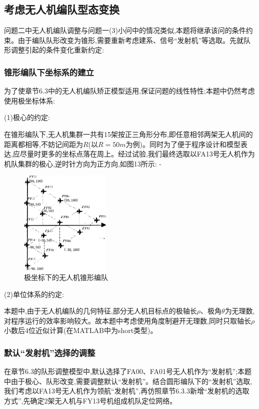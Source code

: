 \documentclass[withoutpreface,bwprint]{cumcmthesis}
\begin{document}
	\subsection{考虑无人机编队型态变换}
	
	问题二中无人机编队调整与问题一(3)小问中的情况类似,本题将继承该问的条件约束。由于编队队形改变为锥形,需要重新考虑建系、信号“发射机”等选取。先就队形调整引起的条件变化重新约定:
	
	\subsubsection{锥形编队下坐标系的建立}
	
	为了使章节6.3中的无人机编队矫正模型适用,保证问题的线性特性;本题中仍然考虑使用极坐标体系:
	
	(1)极心的约定:
	
	在锥形编队下,无人机集群一共有15架按正三角形分布,即任意相邻两架无人机间的距离都相等,不妨记间距为$R$(以$R=50m$为例)。同时为了便于程序设计和模型表达,应尽量时更多的坐标点落在周上。经过试验,我们最终选取以FA13号无人机作为机队集群的极心,逆时针方向为正方向,如图13所示:
	-		
	\begin{figure}[htbp!]
		\centering
		\includegraphics[height=5cm]{./figures/7-1.png}
		\caption{极坐标下的无人机锥形编队}\label{fig:15}
	\end{figure}
	
	(2)单位体系的约定:
	
	本题中,由于无人机编队的几何特征,部分无人机目标点的极轴长$\rho$、极角$\theta$为无理数,对程序运行的效率影响较大。故本题中考虑使用角度制避开无理数,同时只取轴长$\rho$小数后4位近似计算(在MATLAB中为short类型)。
	
	\subsubsection{默认“发射机”选择的调整}
	
	在章节6.3的队形调整模型中,默认选择了FA00、FA01号无人机作为“发射机”;本题中由于极心、队形改变,需要调整默认“发射机”。结合圆形编队下的“发射机”选取,我们考虑以FA13号无人机作为领航“发射机”,再仿照章节6.3.3新增“发射机的选取方式”,先确定2架无人机与FY13号机组成机队定位网络。
	
\end{document}
